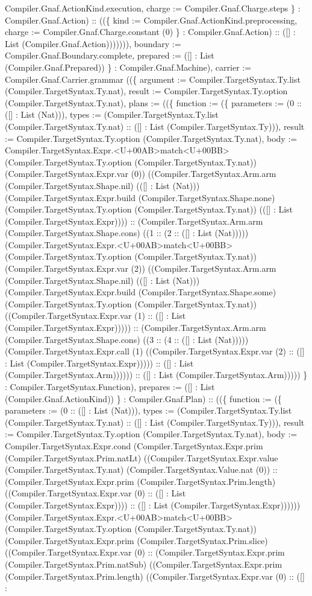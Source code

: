 \documentclass[11pt]{article}
\begin{document}
Compiler.Gnaf.ActionKind.execution, charge := Compiler.Gnaf.Charge.steps \} : Compiler.Gnaf.Action) :: ((\{ kind := Compiler.Gnaf.ActionKind.preprocessing, charge := Compiler.Gnaf.Charge.constant (0) \} : Compiler.Gnaf.Action) :: ([] : List (Compiler.Gnaf.Action))))))), boundary := Compiler.Gnaf.Boundary.complete, prepared := ([] : List (Compiler.Gnaf.Prepared)) \} : Compiler.Gnaf.Machine), carrier := Compiler.Gnaf.Carrier.grammar ((\{ argument := Compiler.TargetSyntax.Ty.list (Compiler.TargetSyntax.Ty.nat), result := Compiler.TargetSyntax.Ty.option (Compiler.TargetSyntax.Ty.nat), plans := ((\{ function := (\{ parameters := (0 :: ([] : List (Nat))), types := (Compiler.TargetSyntax.Ty.list (Compiler.TargetSyntax.Ty.nat) :: ([] : List (Compiler.TargetSyntax.Ty))), result := Compiler.TargetSyntax.Ty.option (Compiler.TargetSyntax.Ty.nat), body := Compiler.TargetSyntax.Expr.<U+00AB>match<U+00BB> (Compiler.TargetSyntax.Ty.option (Compiler.TargetSyntax.Ty.nat)) (Compiler.TargetSyntax.Expr.var (0)) ((Compiler.TargetSyntax.Arm.arm (Compiler.TargetSyntax.Shape.nil) (([] : List (Nat))) (Compiler.TargetSyntax.Expr.build (Compiler.TargetSyntax.Shape.none) (Compiler.TargetSyntax.Ty.option (Compiler.TargetSyntax.Ty.nat)) (([] : List (Compiler.TargetSyntax.Expr)))) :: (Compiler.TargetSyntax.Arm.arm (Compiler.TargetSyntax.Shape.cons) ((1 :: (2 :: ([] : List (Nat))))) (Compiler.TargetSyntax.Expr.<U+00AB>match<U+00BB> (Compiler.TargetSyntax.Ty.option (Compiler.TargetSyntax.Ty.nat)) (Compiler.TargetSyntax.Expr.var (2)) ((Compiler.TargetSyntax.Arm.arm (Compiler.TargetSyntax.Shape.nil) (([] : List (Nat))) (Compiler.TargetSyntax.Expr.build (Compiler.TargetSyntax.Shape.some) (Compiler.TargetSyntax.Ty.option (Compiler.TargetSyntax.Ty.nat)) ((Compiler.TargetSyntax.Expr.var (1) :: ([] : List (Compiler.TargetSyntax.Expr))))) :: (Compiler.TargetSyntax.Arm.arm (Compiler.TargetSyntax.Shape.cons) ((3 :: (4 :: ([] : List (Nat))))) (Compiler.TargetSyntax.Expr.call (1) ((Compiler.TargetSyntax.Expr.var (2) :: ([] : List (Compiler.TargetSyntax.Expr))))) :: ([] : List (Compiler.TargetSyntax.Arm)))))) :: ([] : List (Compiler.TargetSyntax.Arm))))) \} : Compiler.TargetSyntax.Function), prepares := ([] : List (Compiler.Gnaf.ActionKind)) \} : Compiler.Gnaf.Plan) :: ((\{ function := (\{ parameters := (0 :: ([] : List (Nat))), types := (Compiler.TargetSyntax.Ty.list (Compiler.TargetSyntax.Ty.nat) :: ([] : List (Compiler.TargetSyntax.Ty))), result := Compiler.TargetSyntax.Ty.option (Compiler.TargetSyntax.Ty.nat), body := Compiler.TargetSyntax.Expr.cond (Compiler.TargetSyntax.Expr.prim (Compiler.TargetSyntax.Prim.natLt) ((Compiler.TargetSyntax.Expr.value (Compiler.TargetSyntax.Ty.nat) (Compiler.TargetSyntax.Value.nat (0)) :: (Compiler.TargetSyntax.Expr.prim (Compiler.TargetSyntax.Prim.length) ((Compiler.TargetSyntax.Expr.var (0) :: ([] : List (Compiler.TargetSyntax.Expr)))) :: ([] : List (Compiler.TargetSyntax.Expr)))))) (Compiler.TargetSyntax.Expr.<U+00AB>match<U+00BB> (Compiler.TargetSyntax.Ty.option (Compiler.TargetSyntax.Ty.nat)) (Compiler.TargetSyntax.Expr.prim (Compiler.TargetSyntax.Prim.slice) ((Compiler.TargetSyntax.Expr.var (0) :: (Compiler.TargetSyntax.Expr.prim (Compiler.TargetSyntax.Prim.natSub) ((Compiler.TargetSyntax.Expr.prim (Compiler.TargetSyntax.Prim.length) ((Compiler.TargetSyntax.Expr.var (0) :: ([] : 
\end{document}
